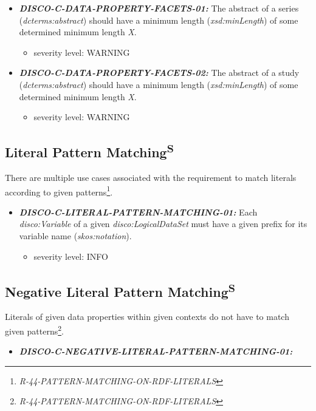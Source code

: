 \documentclass{llncs}
\begin{document}
\begin{itemize}
	\item \textbf{{\em DISCO-C-DATA-PROPERTY-FACETS-01:}} The abstract of a series (\emph{dcterms:abstract}) should have a minimum length (\emph{xsd:minLength}) of some determined minimum length \emph{X}. 
	\begin{itemize}
		\item severity level: WARNING
	\end{itemize}
	\item \textbf{{\em DISCO-C-DATA-PROPERTY-FACETS-02:}} The abstract of a study (\emph{dcterms:abstract}) should have a minimum length (\emph{xsd:minLength}) of some determined minimum length \emph{X}. 
	\begin{itemize}
		\item severity level: WARNING
	\end{itemize}
\end{itemize}

\subsection{Literal Pattern Matching\textsuperscript{S}}

There are multiple use cases associated with the requirement to match literals according to given patterns\footnote{\emph{R-44-PATTERN-MATCHING-ON-RDF-LITERALS}}.

\begin{itemize}
	\item \textbf{{\em DISCO-C-LITERAL-PATTERN-MATCHING-01:}} Each \emph{disco:Variable} of a given \emph{disco:LogicalDataSet} must have a given prefix for its variable name (\emph{skos:notation}). 
	\begin{itemize}
		\item severity level: INFO
	\end{itemize}
\end{itemize}

\subsection{Negative Literal Pattern Matching\textsuperscript{S}}

Literals of given data properties within given contexts do not have to match given patterns\footnote{\emph{R-44-PATTERN-MATCHING-ON-RDF-LITERALS}}. 

\begin{itemize}
	\item \textbf{{\em DISCO-C-NEGATIVE-LITERAL-PATTERN-MATCHING-01:}} 
\end{itemize}
\end{document}
